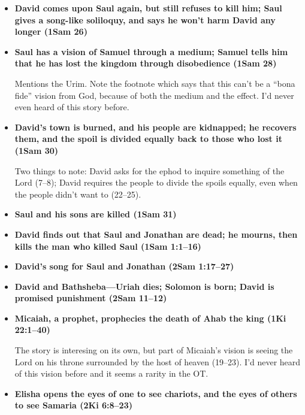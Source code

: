 \begin{itemize}
	Some temple symbolism here maybe, with the cutting of the skirt from Saul's clothes and the talk about Saul being the ``Lord's anointed.''

\item \textbf{David comes upon Saul again, but still refuses to kill him; Saul gives a song-like soliloquy, and says he won't harm David any longer (1Sam 26)}	

\item \textbf{Saul has a vision of Samuel through a medium; Samuel tells him that he has lost the kingdom through disobedience (1Sam 28)}

	Mentions the Urim. Note the footnote which says that this can't be a ``bona fide'' vision from God, because of both the medium and the effect. I'd never even heard of this story before.

\item \textbf{David's town is burned, and his people are kidnapped; he recovers them, and the spoil is divided equally back to those who lost it (1Sam 30)}

	Two things to note: David asks for the ephod to inquire something of the Lord (7--8); David requires the people to divide the spoils equally, even when the people didn't want to (22--25).
	
\item \textbf{Saul and his sons are killed (1Sam 31)}

\item \textbf{David finds out that Saul and Jonathan are dead; he mourns, then kills the man who killed Saul (1Sam 1:1--16)}

\item \textbf{David's song for Saul and Jonathan (2Sam 1:17--27)}

\item \textbf{David and Bathsheba---Uriah dies; Solomon is born; David is promised punishment (2Sam 11--12)}

\item \textbf{Micaiah, a prophet, prophecies the death of Ahab the king (1Ki 22:1--40)}

	The story is interesing on its own, but part of Micaiah's vision is seeing the Lord on his throne surrounded by the host of heaven (19--23). I'd never heard of this vision before and it seems a rarity in the OT.
	
\item \textbf{Elisha opens the eyes of one to see chariots, and the eyes of others to see Samaria (2Ki 6:8--23)} 


\end{itemize}

